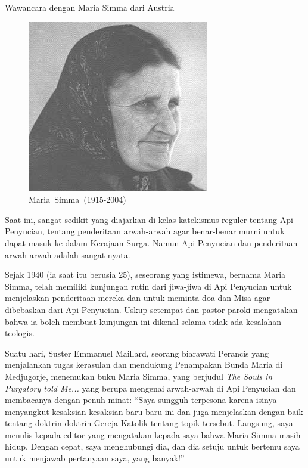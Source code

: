 
\begin{center}\large
Wawancara dengan Maria Simma dari Austria
\normalsize
\end{center}
\setlength{\parindent}{0cm}
\renewcommand{\figurename}{~}

\begin{figure}
\centering
\includegraphics[scale=0.25]{gambar/simma.jpg}
\caption{\scriptsize\mbox{Maria Simma (1915-2004)}\normalsize}
\end{figure}

Saat ini, sangat sedikit yang diajarkan di kelas katekismus reguler tentang Api Penyucian, tentang penderitaan arwah-arwah agar benar-benar murni untuk dapat masuk ke dalam Kerajaan Surga. Namun Api Penyucian dan penderitaan arwah-arwah  adalah sangat nyata.

Sejak 1940 (ia saat itu berusia 25), seseorang yang istimewa, bernama Maria Simma, telah memiliki kunjungan rutin dari jiwa-jiwa di Api Penyucian untuk menjelaskan penderitaan mereka dan untuk meminta doa dan Misa agar dibebaskan dari Api Penyucian. Uskup setempat dan pastor paroki mengatakan bahwa ia boleh membuat kunjungan ini dikenal selama tidak ada kesalahan teologis.

Suatu hari, Suster Emmanuel Maillard, seorang biarawati Perancis yang menjalankan tugas kerasulan dan mendukung Penampakan Bunda Maria di Medjugorje, menemukan buku Maria Simma, yang berjudul \textit{The Souls in Purgatory told Me...} yang berupa mengenai arwah-arwah di Api Penyucian dan membacanya dengan penuh minat: ``Saya sungguh terpesona karena isinya menyangkut kesaksian-kesaksian baru-baru ini dan juga menjelaskan dengan baik tentang doktrin-doktrin Gereja Katolik tentang topik tersebut. Langsung, saya menulis kepada editor yang mengatakan kepada saya bahwa Maria Simma masih hidup. Dengan cepat, saya menghubungi dia, dan dia setuju untuk bertemu saya untuk menjawab pertanyaan saya, yang banyak!''

